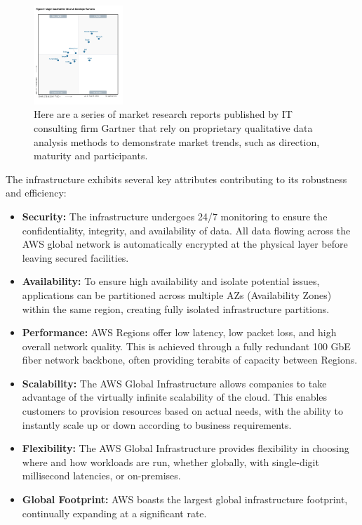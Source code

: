 \begin{figure}[h]  %
  \centering
  \includegraphics[width=0.3\textwidth]{images/AWSMagicQuadrantForCloud.png}  %
  \caption{Here are a series of market research reports published by IT consulting firm Gartner that rely on proprietary qualitative data analysis methods to demonstrate market trends, such as direction, maturity and participants. \cite{GartnerMagicQuadrant}}
  \label{fig:AWSMagicQuadrantForCloud}
\end{figure}

The infrastructure exhibits several key attributes contributing to its robustness and efficiency: 
\begin{itemize} 
  \item \textbf{Security:} The infrastructure undergoes 24/7 monitoring to ensure the confidentiality, integrity, and availability of data. All data flowing across the AWS global network is automatically encrypted at the physical layer before leaving secured facilities.
  \item \textbf{Availability:} To ensure high availability and isolate potential issues, applications can be partitioned across multiple AZs (Availability Zones) within the same region, creating fully isolated infrastructure partitions.
  \item \textbf{Performance:} AWS Regions offer low latency, low packet loss, and high overall network quality. This is achieved through a fully redundant 100 GbE fiber network backbone, often providing terabits of capacity between Regions.
  \item \textbf{Scalability:} The AWS Global Infrastructure allows companies to take advantage of the virtually infinite scalability of the cloud. This enables customers to provision resources based on actual needs, with the ability to instantly scale up or down according to business requirements.
  \item \textbf{Flexibility:} The AWS Global Infrastructure provides flexibility in choosing where and how workloads are run, whether globally, with single-digit millisecond latencies, or on-premises.
  \item \textbf{Global Footprint:} AWS boasts the largest global infrastructure footprint, continually expanding at a significant rate.
\end{itemize}

